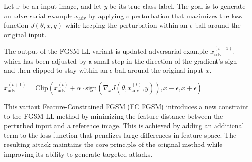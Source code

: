 Let $x$ be an input image, and let $y$ be its true class label. The goal is to generate an adversarial example $x_{\text{adv}}$ by applying a perturbation that maximizes the loss function $J(\theta, x, y)$ while keeping the perturbation within an $\epsilon$-ball around the original input.

The output of the FGSM-LL variant is updated adversarial example $x_{\text{adv}}^{(t+1)}$, which has been adjusted by a small step in the direction of the gradient's sign and then clipped to stay within an $\epsilon$-ball around the original input $x$.

$x_{\text{adv}}^{(t+1)} = \text{Clip}(x_{\text{adv}}^{(t)} + \alpha \cdot \text{sign}(\nabla_x J(\theta, x_{\text{adv}}^{(t)}, y)), x - \epsilon, x + \epsilon)$

This variant Feature-Constrained FGSM (FC FGSM) introduces a new constraint to the FGSM-LL method by minimizing the feature distance between the perturbed input and a reference image. This is achieved by adding an additional term to the loss function that penalizes large differences in feature space. The resulting attack maintains the core principle of the original method while improving its ability to generate targeted attacks.